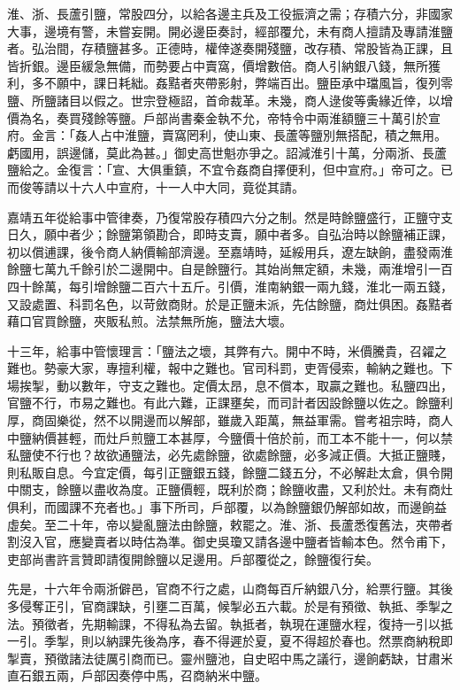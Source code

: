 淮、浙、長蘆引鹽，常股四分，以給各邊主兵及工役振濟之需；存積六分，非國家大事，邊境有警，未嘗妄開。開必邊臣奏討，經部覆允，未有商人擅請及專請淮鹽者。弘治間，存積鹽甚多。正德時，權倖遂奏開殘鹽，改存積、常股皆為正課，且皆折銀。邊臣緩急無備，而勢要占中賣窩，價增數倍。商人引納銀八錢，無所獲利，多不願中，課日耗絀。姦黠者夾帶影射，弊端百出。鹽臣承中璫風旨，復列零鹽、所鹽諸目以假之。世宗登極詔，首命裁革。未幾，商人逯俊等夤緣近倖，以增價為名，奏買殘餘等鹽。戶部尚書秦金執不允，帝特令中兩淮額鹽三十萬引於宣府。金言：「姦人占中淮鹽，賣窩罔利，使山東、長蘆等鹽別無搭配，積之無用。虧國用，誤邊儲，莫此為甚。」御史高世魁亦爭之。詔減淮引十萬，分兩浙、長蘆鹽給之。金復言：「宣、大俱重鎮，不宜令姦商自擇便利，但中宣府。」帝可之。已而俊等請以十六人中宣府，十一人中大同，竟從其請。

嘉靖五年從給事中管律奏，乃復常股存積四六分之制。然是時餘鹽盛行，正鹽守支日久，願中者少；餘鹽第領勘合，即時支賣，願中者多。自弘治時以餘鹽補正課，初以償逋課，後令商人納價輸部濟邊。至嘉靖時，延綏用兵，遼左缺餉，盡發兩淮餘鹽七萬九千餘引於二邊開中。自是餘鹽行。其始尚無定額，未幾，兩淮增引一百四十餘萬，每引增餘鹽二百六十五斤。引價，淮南納銀一兩九錢，淮北一兩五錢，又設處置、科罰名色，以苛斂商財。於是正鹽未派，先估餘鹽，商灶俱困。姦黠者藉口官買餘鹽，夾販私煎。法禁無所施，鹽法大壞。

十三年，給事中管懷理言：「鹽法之壞，其弊有六。開中不時，米價騰貴，召糴之難也。勢豪大家，專擅利權，報中之難也。官司科罰，吏胥侵索，輸納之難也。下場挨掣，動以數年，守支之難也。定價太昂，息不償本，取贏之難也。私鹽四出，官鹽不行，市易之難也。有此六難，正課壅矣，而司計者因設餘鹽以佐之。餘鹽利厚，商固樂從，然不以開邊而以解部，雖歲入距萬，無益軍需。嘗考祖宗時，商人中鹽納價甚輕，而灶戶煎鹽工本甚厚，今鹽價十倍於前，而工本不能十一，何以禁私鹽使不行也？故欲通鹽法，必先處餘鹽，欲處餘鹽，必多減正價。大抵正鹽賤，則私販自息。今宜定價，每引正鹽銀五錢，餘鹽二錢五分，不必解赴太倉，俱令開中關支，餘鹽以盡收為度。正鹽價輕，既利於商；餘鹽收盡，又利於灶。未有商灶俱利，而國課不充者也。」事下所司，戶部覆，以為餘鹽銀仍解部如故，而邊餉益虛矣。至二十年，帝以變亂鹽法由餘鹽，敕罷之。淮、浙、長蘆悉復舊法，夾帶者割沒入官，應變賣者以時估為準。御史吳瓊又請各邊中鹽者皆輸本色。然令甫下，吏部尚書許言贊即請復開餘鹽以足邊用。戶部覆從之，餘鹽復行矣。

先是，十六年令兩浙僻邑，官商不行之處，山商每百斤納銀八分，給票行鹽。其後多侵奪正引，官商課缺，引壅二百萬，候掣必五六載。於是有預徵、執抵、季掣之法。預徵者，先期輸課，不得私為去留。執抵者，執現在運鹽水程，復持一引以抵一引。季掣，則以納課先後為序，春不得遲於夏，夏不得超於春也。然票商納稅即掣賣，預徵諸法徒厲引商而已。靈州鹽池，自史昭中馬之議行，邊餉虧缺，甘肅米直石銀五兩，戶部因奏停中馬，召商納米中鹽。

